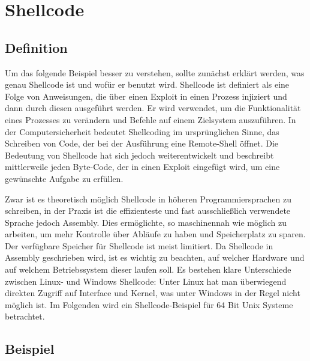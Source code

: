 \section{Shellcode} \label{sec:shellcode}
\subsection{Definition}
Um das folgende Beispiel besser zu verstehen, sollte zunächst erklärt werden, was genau Shellcode ist und wofür er benutzt wird.
Shellcode ist definiert als eine Folge von Anweisungen, die über einen Exploit in einen Prozess injiziert und
dann durch diesen ausgeführt werden. Er wird verwendet, um die Funktionalität eines Prozesses zu verändern und
Befehle auf einem Zielsystem auszuführen. In der Computersicherheit bedeutet Shellcoding im ursprünglichen Sinne,
das Schreiben von Code, der bei der Ausführung eine Remote-Shell öffnet. Die Bedeutung von Shellcode hat sich jedoch weiterentwickelt und
beschreibt mittlerweile jeden Byte-Code, der in einen Exploit eingefügt wird, um eine gewünschte Aufgabe zu erfüllen.

Zwar ist es theoretisch möglich Shellcode in höheren Programmiersprachen zu schreiben, in der Praxis ist die effizienteste und
fast ausschließlich verwendete Sprache jedoch Assembly. Dies ermöglichte, so maschinennah wie möglich zu arbeiten,
um mehr Kontrolle über Abläufe zu haben und Speicherplatz zu sparen. Der verfügbare Speicher für Shellcode ist meist limitiert.
Da Shellcode in Assembly geschrieben wird, ist es wichtig zu beachten, auf welcher Hardware und auf welchem Betriebssystem dieser laufen soll.
Es bestehen klare Unterschiede zwischen Linux- und Windows Shellcode: Unter Linux hat man überwiegend direkten Zugriff auf Interface und Kernel,
was unter Windows in der Regel nicht möglich ist. Im Folgenden wird ein Shellcode-Beispiel für 64 Bit Unix Systeme betrachtet. \cite{tutorial1}

\subsection{Beispiel}

